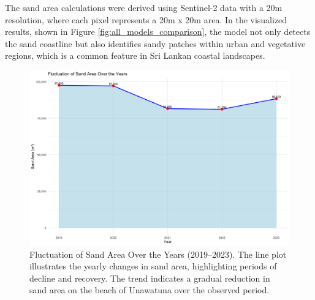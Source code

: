 \documentclass[a4paper,12pt]{article}
\begin{document}
The sand area calculations were derived using Sentinel-2 data with a 20m resolution, where each pixel represents a 20m x 20m area. In the visualized results, shown in Figure \ref{fig:all_models_comparison}, the model not only detects the sand coastline but also identifies sandy patches within urban and vegetative regions, which is a common feature in Sri Lankan coastal landscapes.
\begin{figure} [H]
    \centering
    \includegraphics[width=0.7\linewidth]{Timeline/Sand Area Time.png}
    \caption[Fluctuation of Sand Area (2019–2023)]{Fluctuation of Sand Area Over the Years (2019–2023). The line plot illustrates the yearly changes in sand area, highlighting periods of decline and recovery. The trend indicates a gradual reduction in sand area on the beach of Unawatuna over the observed period.}
    \label{fig:Sand Area Time}
\end{figure}
\end{document}
